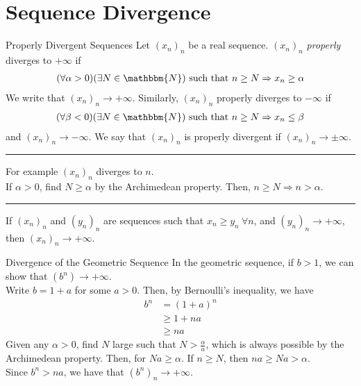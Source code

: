 \documentclass[10pt]{extarticle}
\newcommand{\N}{\mathbbm{N}}
\begin{document}
  \section*{Sequence Divergence}%
  \begin{problem}{Properly Divergent Sequences}
    Let $(x_n)_n$ be a real sequence. $(x_n)_n$ \textsl{properly} diverges to $+\infty$ if
    \begin{align*}
      (\forall \alpha > 0)(\exists N\in\N) \text{ such that } n\geq N \Rightarrow x_{n} \geq \alpha
    \end{align*}
    We write that $(x_n)_n \rightarrow +\infty$. Similarly, $(x_n)_n$ properly diverges to $-\infty$ if
    \begin{align*}
      (\forall \beta < 0)(\exists N\in\N) \text{ such that } n\geq N \Rightarrow x_n \leq \beta
    \end{align*}
    and $(x_n)_n \rightarrow -\infty$. We say that $(x_n)_n$ is properly divergent if $(x_n)_n\rightarrow \pm \infty$.\\
    \vspace{4pt}
    \rule{\textwidth}{0.4pt}
    \vspace{4pt}
    For example $(x_n)_n$ diverges to $n$.\\

    If $\alpha > 0$, find $N \geq \alpha$ by the Archimedean property. Then, $n\geq N \Rightarrow n > \alpha$.\\
    \vspace{4pt}
    \rule{\textwidth}{0.4pt}
    \vspace{4pt}
    If $(x_n)_n$ and $(y_n)_n$ are sequences such that $x_n \geq y_n~\forall n$, and $(y_n)_n \rightarrow +\infty$, then $(x_n)_n \rightarrow +\infty$.
  \end{problem}
  \begin{problem}{Divergence of the Geometric Sequence}
    In the geometric sequence, if $b > 1$, we can show that $\left(b^n\right) \rightarrow +\infty$.\\

    Write $b = 1 + a$ for some $a > 0$. Then, by Bernoulli's inequality, we have
    \begin{align*}
      b^n &= (1+a)^n \\
          &\geq 1 + na\\
          &\geq na
    \end{align*}
    Given any $\alpha > 0$, find $N$ large such that $N > \frac{\alpha}{a}$, which is always possible by the Archimedean property. Then, for $Na \geq \alpha$. If $n\geq N$, then $na \geq Na > \alpha$.\\

    Since $b^n > na$, we have that $\left(b^n\right)_n \rightarrow +\infty$.
  \end{problem}
\end{document}
